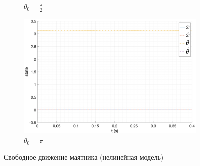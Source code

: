 \begin{figure}[ht!]
\begin{subfigure}[b]{0.45\textwidth}
        \caption{$\theta_0 = \frac{\pi}{2}$}
    \end{subfigure}
    \begin{subfigure}[b]{0.45\textwidth}
        \includegraphics[width=\textwidth]{media/plots/free_motion/state_6.png}
        \caption{$\theta_0 = \pi$}
    \end{subfigure}
    \caption{Свободное движение маятника (нелинейная модель)}
    \label{fig:free_motion_nonlinear}
\end{figure}

